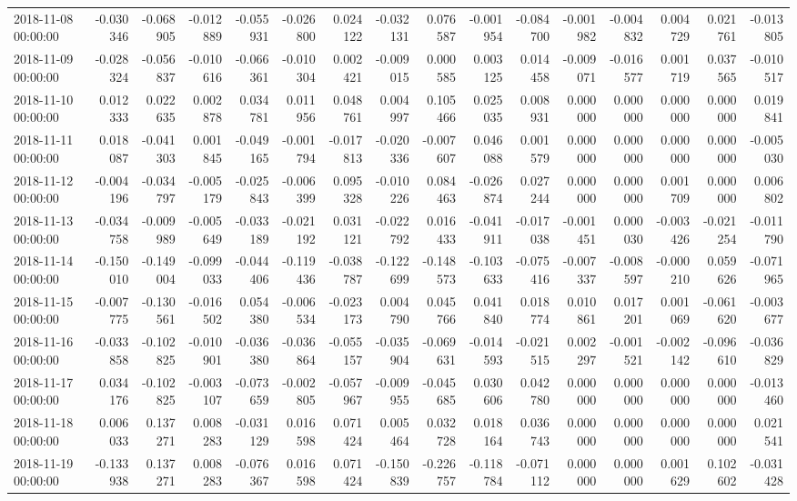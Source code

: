 \begin{tabular}{lrrrrrrrrrrrrrrr}
2018-11-08 00:00:00 & -0.030346 & -0.068905 & -0.012889 & -0.055931 & -0.026800 & 0.024122 & -0.032131 & 0.076587 & -0.001954 & -0.084700 & -0.001982 & -0.004832 & 0.004729 & 0.021761 & -0.013805 \\
2018-11-09 00:00:00 & -0.028324 & -0.056837 & -0.010616 & -0.066361 & -0.010304 & 0.002421 & -0.009015 & 0.000585 & 0.003125 & 0.014458 & -0.009071 & -0.016577 & 0.001719 & 0.037565 & -0.010517 \\
2018-11-10 00:00:00 & 0.012333 & 0.022635 & 0.002878 & 0.034781 & 0.011956 & 0.048761 & 0.004997 & 0.105466 & 0.025035 & 0.008931 & 0.000000 & 0.000000 & 0.000000 & 0.000000 & 0.019841 \\
2018-11-11 00:00:00 & 0.018087 & -0.041303 & 0.001845 & -0.049165 & -0.001794 & -0.017813 & -0.020336 & -0.007607 & 0.046088 & 0.001579 & 0.000000 & 0.000000 & 0.000000 & 0.000000 & -0.005030 \\
2018-11-12 00:00:00 & -0.004196 & -0.034797 & -0.005179 & -0.025843 & -0.006399 & 0.095328 & -0.010226 & 0.084463 & -0.026874 & 0.027244 & 0.000000 & 0.000000 & 0.001709 & 0.000000 & 0.006802 \\
2018-11-13 00:00:00 & -0.034758 & -0.009989 & -0.005649 & -0.033189 & -0.021192 & 0.031121 & -0.022792 & 0.016433 & -0.041911 & -0.017038 & -0.001451 & 0.000030 & -0.003426 & -0.021254 & -0.011790 \\
2018-11-14 00:00:00 & -0.150010 & -0.149004 & -0.099033 & -0.044406 & -0.119436 & -0.038787 & -0.122699 & -0.148573 & -0.103633 & -0.075416 & -0.007337 & -0.008597 & -0.000210 & 0.059626 & -0.071965 \\
2018-11-15 00:00:00 & -0.007775 & -0.130561 & -0.016502 & 0.054380 & -0.006534 & -0.023173 & 0.004790 & 0.045766 & 0.041840 & 0.018774 & 0.010861 & 0.017201 & 0.001069 & -0.061620 & -0.003677 \\
2018-11-16 00:00:00 & -0.033858 & -0.102825 & -0.010901 & -0.036380 & -0.036864 & -0.055157 & -0.035904 & -0.069631 & -0.014593 & -0.021515 & 0.002297 & -0.001521 & -0.002142 & -0.096610 & -0.036829 \\
2018-11-17 00:00:00 & 0.034176 & -0.102825 & -0.003107 & -0.073659 & -0.002805 & -0.057967 & -0.009955 & -0.045685 & 0.030606 & 0.042780 & 0.000000 & 0.000000 & 0.000000 & 0.000000 & -0.013460 \\
2018-11-18 00:00:00 & 0.006033 & 0.137271 & 0.008283 & -0.031129 & 0.016598 & 0.071424 & 0.005464 & 0.032728 & 0.018164 & 0.036743 & 0.000000 & 0.000000 & 0.000000 & 0.000000 & 0.021541 \\
2018-11-19 00:00:00 & -0.133938 & 0.137271 & 0.008283 & -0.076367 & 0.016598 & 0.071424 & -0.150839 & -0.226757 & -0.118784 & -0.071112 & 0.000000 & 0.000000 & 0.001629 & 0.102602 & -0.031428 \\

\end{tabular}
